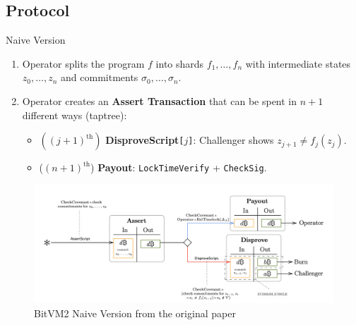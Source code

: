 \documentclass{zkdl-presentation-template}
\begin{document}
    \subsection{Protocol}
      \begin{frame}{Naive Version}  
        \begin{enumerate}
            \item Operator splits the program $f$ into shards $f_1,\dots,f_n$ with intermediate states $z_0,\dots,z_n$ and commitments $\sigma_0,\dots,\sigma_n$.
            \item Operator creates an \textbf{Assert Transaction} that can be spent in $n+1$ different ways (taptree):
            \begin{itemize}[label={}]
                \item $((j+1)^{\text{th}})$ \hspace{1px} \textbf{DisproveScript}\texttt{[}$j$\texttt{]}: Challenger shows $z_{j+1} \neq f_j(z_j)$.
                \item ($(n+1)^{\text{th}}$) \hspace{1px} \textbf{Payout}: \texttt{LockTimeVerify} + \texttt{CheckSig}.
            \end{itemize}
        \end{enumerate}

        \begin{figure}
            \centering
            \includegraphics[width=0.95\linewidth]{images/bitvm_basic_structure.png}
            \caption{BitVM2 Naive Version from the original paper}
            \label{fig:bitvm2_naive}
        \end{figure}
      \end{frame}
\end{document}
